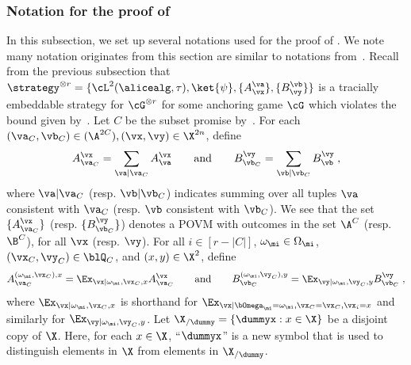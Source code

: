 \subsubsection{Notation for the proof of } \label{sec:states-operators}

In this subsection, we set up several notations used for the proof of . We note many notation originates from this section are similar to notations from~\cite[Section 4.4]{bavarianAnchoredParallelRepetition2021}. Recall from the previous subsection that $\strategy^{\otimes r} = \{ \cL^2(\alicealg, \tau), \ket{\psi}, \{A_
\vx^\va \}, \{B_\vy^\vb \} \}$ is a tracially embeddable strategy for $\cG^{\otimes r}$ for some anchoring game $\cG$ which violates the bound given by~. Let $C$ be the subset promise by~. For each $(\va_C,\vb_C) \in (\A^{2C}), (\vx, \vy) \in \X^{2n}$, define
\begin{equation}
	\label{eq:states-operators-1}
	A^{\vx}_{\va_C} = \sum_{\va | \va_C} A^{\vx}_{\va} \qquad\text{and} \qquad B^{\vy}_{\vb_C} = \sum_{\vb | \vb_C} B^{\vy}_{\vb} \;,
\end{equation}
where $\va | \va_C$ (resp. $\vb | \vb_C$) indicates summing over all tuples $\va$ consistent with $\va_C$ (resp. $\vb$ consistent with $\vb_C$). We see that the set $\{ A^\vx_{\va_C} \}$ (resp. $\{ B^\vy_{\vb_C} \}$) denotes a POVM with outcomes in the set $\A^C$ (resp. $\B^C$), for all $\vx$ (resp. $\vy$). For all $i \in [r-|C|]$, $\omega_\mi \in \Omega_{\mi}$, $(\vx_C, \vy_C) \in \blQ_C$, and $(x,y) \in \X^2$, define
\begin{equation}
	\label{eq:states-operators-2}
	A^{(\omega_\mi,\vx_C), x}_{\va_C}  = \Ex_{\vx | \omega_\mi,\vx_C , x} A^{\vx}_{\va_C} \qquad \text{and} \qquad  B^{(\omega_\mi, \vy_C), y}_{\vb_C} = \Ex_{\vy | \omega_\mi,\vy_C, y}B^{\vy}_{\vb_C}\;,
\end{equation}
where $\Ex_{\vx | \omega_\mi,\vx_C , x}$ is shorthand for $\Ex_{\vx | \bOmega_\mi = \omega_\mi, \vx_C = \vx_C, \vx_i = x}$ and similarly for $\Ex_{\vy | \omega_\mi, \vy_C, y}$. Let $\X_{/\dummy} = \{ \dummyx : x\in \X\}$ be a disjoint copy of $\X$. Here, for each $x\in \X$, ``$\dummyx$'' is a new symbol that is used to distinguish elements in $\X$ from elements in $\X_{/\dummy}$. 

